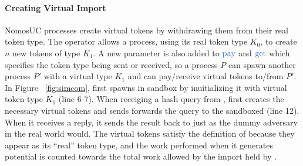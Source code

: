 \paragraph{Creating Virtual Import}
NomosUC processes create virtual tokens by withdrawing them from their real token type. 
The operator  allows a process, using its real token type $K_0$, to create $n$ new tokens of type $K_1$.
A new parameter is also added to $\npay$ and $\nget$ which specifies the token type being sent or received, so a process $P$ can spawn another process $P'$ with a virtual type $K_1$ and can pay/receive virtual tokens to/from $P'$.
In Figure ~\ref{fig:simcom}, \simcom first spawns \Fro in sandbox by inuitializing it with virtual token type $K_1$ (line 6-7). 
When receiging a hash query from \Z, \simcom first creates the necessary virtual tokens and sends forwards the query to the sandboxed \Fro (line 12).
When it receives a reply, it sends the result back to \Z just as the dummy adversary in the real world would.
The virtual tokens satisfy the definition of \Fro because they appear as its ``real'' token type, and the work performed when it generates potential is counted towards the total work allowed by the import held by \simcom.

